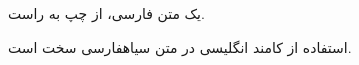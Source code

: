 \documentclass{article}
\begin{document}
یک متن فارسی، از چپ به راست.

استفاده از کامند  انگلیسی در متن ‌سیاه{فارسی} سخت است. 
\end{document}
